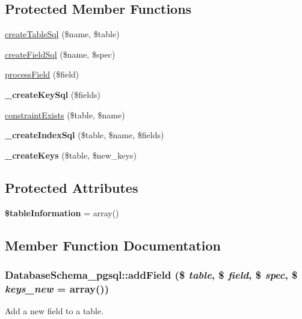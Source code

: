 \subsection*{Protected Member Functions}
\begin{DoxyCompactItemize}
\item 
\hyperlink{classDatabaseSchema__pgsql_a71a8f78d8cabb3ad4a1db0e9f058e740}{createTableSql} (\$name, \$table)
\item 
\hyperlink{classDatabaseSchema__pgsql_a77e847ece697a97079c2ecf0fb7eda47}{createFieldSql} (\$name, \$spec)
\item 
\hyperlink{classDatabaseSchema__pgsql_ac951ca95de7746ddd930e8678f0d7f33}{processField} (\$field)
\item 
\hypertarget{classDatabaseSchema__pgsql_aa95db8ae9b2d37011dd39345db866863}{
{\bfseries \_\-createKeySql} (\$fields)}
\label{classDatabaseSchema__pgsql_aa95db8ae9b2d37011dd39345db866863}

\item 
\hyperlink{classDatabaseSchema__pgsql_ae795d8b318af21e0e57bb6ba9ea7ad93}{constraintExists} (\$table, \$name)
\item 
\hypertarget{classDatabaseSchema__pgsql_a2a6231ce69a44e05c2109a2107800db3}{
{\bfseries \_\-createIndexSql} (\$table, \$name, \$fields)}
\label{classDatabaseSchema__pgsql_a2a6231ce69a44e05c2109a2107800db3}

\item 
\hypertarget{classDatabaseSchema__pgsql_aee38f09de28ea80d6fc4a8daf6c2598c}{
{\bfseries \_\-createKeys} (\$table, \$new\_\-keys)}
\label{classDatabaseSchema__pgsql_aee38f09de28ea80d6fc4a8daf6c2598c}

\end{DoxyCompactItemize}
\subsection*{Protected Attributes}
\begin{DoxyCompactItemize}
\item 
\hypertarget{classDatabaseSchema__pgsql_ab0d08fd2610abec3e3afd1c71b6a23fe}{
{\bfseries \$tableInformation} = array()}
\label{classDatabaseSchema__pgsql_ab0d08fd2610abec3e3afd1c71b6a23fe}

\end{DoxyCompactItemize}


\subsection{Member Function Documentation}
\hypertarget{classDatabaseSchema__pgsql_ad2dad402ce094b71c40136b02c70bc3f}{
\subsubsection[{addField}]{\setlength{\rightskip}{0pt plus 5cm}DatabaseSchema\_\-pgsql::addField (\$ {\em table}, \/  \$ {\em field}, \/  \$ {\em spec}, \/  \$ {\em keys\_\-new} = {\ttfamily array()})}}
\label{classDatabaseSchema__pgsql_ad2dad402ce094b71c40136b02c70bc3f}
Add a new field to a table.


